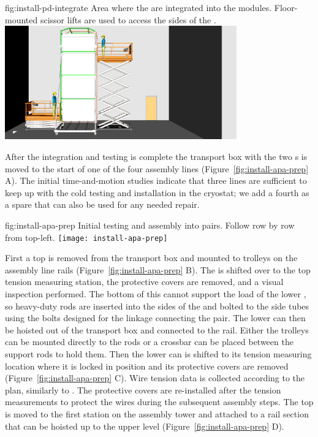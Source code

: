\begin{dunefigure}
{fig:install-pd-integrate}
{Area where the  are integrated into the  modules. Floor-mounted scissor lifts are used to access the sides of the .}
\includegraphics[width=0.75\textwidth]{graphics/install-pd-integrate.pdf}
\end{dunefigure}

After the  integration and testing is complete the transport box with the two s is moved to the start of one of the four assembly lines (Figure~\ref{fig:install-apa-prep} A). 
The initial time-and-motion studies indicate that three lines are sufficient to keep up with the cold testing and installation in the cryostat; we add a fourth as a spare that can also be used for any needed repair. 

\begin{dunefigure}
{fig:install-apa-prep}
{Initial  testing and assembly into pairs.  Follow row by row from top-left.} 
\texttt{[image: install-apa-prep]}
\end{dunefigure}


First a top  is removed from the transport box and mounted to trolleys on the assembly line rails (Figure~\ref{fig:install-apa-prep} B). 
The  is shifted over to the top  tension measuring station, the protective covers are removed, and a visual inspection performed. 
The bottom of this  cannot support the load of the lower , so heavy-duty rods are inserted into the sides of the  and bolted to the side tubes using the bolts designed for the linkage connecting the  pair. 
The lower  can then be hoisted out of the transport box and connected to the rail. 
Either the trolleys can be mounted directly to the rods or  a crossbar can be placed between the support rods to hold them.  
Then the lower  can is shifted to its tension measuring location where it is locked in position and its protective covers are removed (Figure~\ref{fig:install-apa-prep} C). 
Wire tension data is collected according to the  plan, similarly to . 
The protective covers are re-installed after the tension measurements to protect the wires during the subsequent assembly steps. 
The top  is moved to the first station on the  assembly tower and attached to a rail section that can be hoisted up to the upper level (Figure~\ref{fig:install-apa-prep} D). 
 
